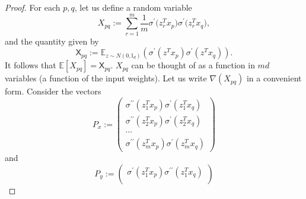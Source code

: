 \documentclass[a4paper,11pt]{amsart}
\newcommand{\IE}{\mathbb{E}}
\theoremstyle{definition}
\theoremstyle{plain}
\theoremstyle{remark}
\begin{document}
\begin{proof}
For each $p,q$, let us define a random variable \[X_{pq}:=\sum_{r=1}^m \frac{1}{m}\sigma^\prime\Big(z_r^Tx_p\Big)\sigma^\prime\Big(z_r^Tx_q\Big),\] and the quantity given by 
\[
\mathsf{X}_{pq}:=\IE_{z\sim N(0,\mathbb{I}_d)}(\sigma^\prime(z^Tx_p)\sigma^\prime(z^Tx_q)).
\]It follows that $\mathbb{E}[X_{pq}]=\mathsf{X}_{pq}$.  $X_{pq}$ can be thought of as a function in $md$ variables (a function of the input weights). Let us write $\nabla(X_{pq})$ in a convenient form. Consider the vectors \[P_x:=\begin{pmatrix}
                                                                                                                                                                                                                                                                              \sigma^{\prime\prime}(z_1^Tx_p)\sigma^\prime(z_1^Tx_q)\\
                                                                                                                                                                                                                                                                              \sigma^{\prime\prime}(z_2^Tx_p)\sigma^\prime(z_2^Tx_q)\\
                                                                                                                                                                                                                                                                              \cdots\\
                                                                                                                                                                                                                                                                              \sigma^{\prime\prime}(z_m^Tx_p)\sigma^\prime(z_m^Tx_q)
                                                                                                                                                                                                                                                                             \end{pmatrix}
\] and \[P_y:=\begin{pmatrix}
                                                                                                                                                                                                                                                                              \sigma^{\prime}(z_1^Tx_p)\sigma^{\prime\prime}(z_1^Tx_q)\\

\end{pmatrix}\]
\end{proof}
\end{document}
